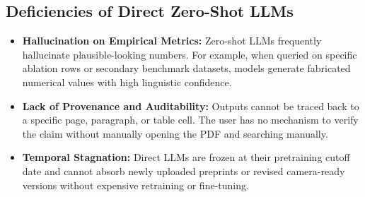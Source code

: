 \subsection{Deficiencies of Direct Zero-Shot LLMs}
\begin{itemize}
    \item \textbf{Hallucination on Empirical Metrics:} Zero-shot LLMs frequently hallucinate plausible-looking numbers. For example, when queried on specific ablation rows or secondary benchmark datasets, models generate fabricated numerical values with high linguistic confidence.
    \item \textbf{Lack of Provenance and Auditability:} Outputs cannot be traced back to a specific page, paragraph, or table cell. The user has no mechanism to verify the claim without manually opening the PDF and searching manually.
    \item \textbf{Temporal Stagnation:} Direct LLMs are frozen at their pretraining cutoff date and cannot absorb newly uploaded preprints or revised camera-ready versions without expensive retraining or fine-tuning.
\end{itemize}

